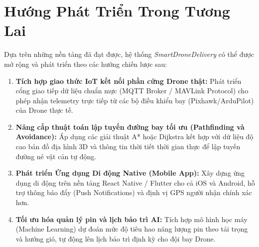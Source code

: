 \section{Hướng Phát Triển Trong Tương Lai}

Dựa trên những nền tảng đã đạt được, hệ thống \textit{SmartDroneDelivery} có thể được mở rộng và phát triển theo các hướng chiến lược sau:

\begin{enumerate}[leftmargin=*]
  \item \textbf{Tích hợp giao thức IoT kết nối phần cứng Drone thật:} Phát triển cổng giao tiếp dữ liệu chuẩn mực (MQTT Broker / MAVLink Protocol) cho phép nhận telemetry trực tiếp từ các bộ điều khiển bay (Pixhawk/ArduPilot) của Drone thực tế.
  \item \textbf{Nâng cấp thuật toán lập tuyến đường bay tối ưu (Pathfinding và Avoidance):} Áp dụng các giải thuật A* hoặc Dijkstra kết hợp với dữ liệu độ cao bản đồ địa hình 3D và thông tin thời tiết thời gian thực để lập tuyến đường né vật cản tự động.
  \item \textbf{Phát triển Ứng dụng Di động Native (Mobile App):} Xây dựng ứng dụng di động trên nền tảng React Native / Flutter cho cả iOS và Android, hỗ trợ thông báo đẩy (Push Notifications) và định vị GPS người nhận chính xác hơn.
  \item \textbf{Tối ưu hóa quản lý pin và lịch bảo trì AI:} Tích hợp mô hình học máy (Machine Learning) dự đoán mức độ tiêu hao năng lượng pin theo tải trọng và hướng gió, tự động lên lịch bảo trì định kỳ cho đội bay Drone.
\end{enumerate}
